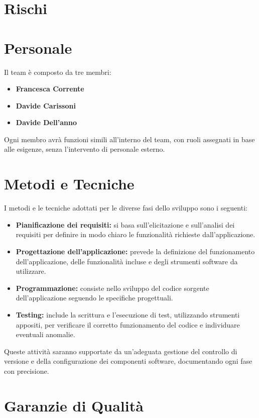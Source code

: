 \documentclass[a4paper,12pt]{article}
\begin{document}
\section{Rischi} %

\section{Personale} %
Il team è composto da tre membri:\begin{itemize}
    \item \textbf{Francesca Corrente} 
    \item \textbf{Davide Carissoni} 
    \item \textbf{Davide Dell’anno} 
\end{itemize}
Ogni membro avrà funzioni simili all’interno del team, con ruoli assegnati in base alle esigenze, senza l’intervento di personale esterno.

\section{Metodi e Tecniche} %
I metodi e le tecniche adottati per le diverse fasi dello sviluppo sono i seguenti:
\begin{itemize}
    \item \textbf{Pianificazione dei requisiti:} si basa sull'elicitazione e sull'analisi dei requisiti per definire in modo chiaro le funzionalità richieste dall'applicazione.
    \item \textbf{Progettazione dell’applicazione:} prevede la definizione del funzionamento dell'applicazione, delle funzionalità incluse e degli strumenti software da utilizzare.
    \item \textbf{Programmazione:} consiste nello sviluppo del codice sorgente dell’applicazione seguendo le specifiche progettuali.
    \item \textbf{Testing:} include la scrittura e l’esecuzione di test, utilizzando strumenti appositi, per verificare il corretto funzionamento del codice e individuare eventuali anomalie.
\end{itemize}
Queste attività saranno supportate da un’adeguata gestione del controllo di versione e della configurazione dei componenti software, documentando ogni fase con precisione.


\section{Garanzie di Qualità} %
\end{document}
